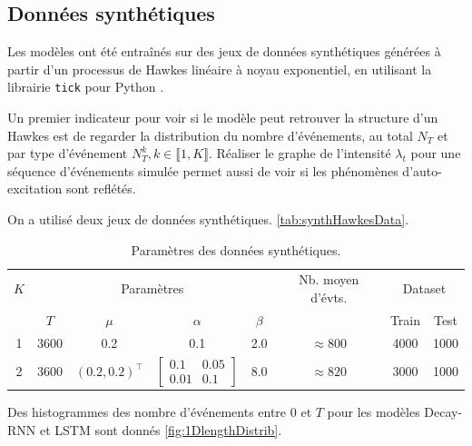 \documentclass[../main.tex]{subfiles}
\begin{document}
\subsection{Données synthétiques}\label{ssec:synthResults}

Les modèles ont été entraînés sur des jeux de données synthétiques générées à partir d'un processus de Hawkes linéaire à noyau exponentiel, en utilisant la librairie \verb|tick| pour Python \cite{2017arXiv170703003B}.

Un premier indicateur pour voir si le modèle peut retrouver la structure d'un Hawkes est de regarder la distribution du nombre d'événements, au total $N_T$ et par type d'événement $N^k_T, k\in\llbracket 1,K\rrbracket$. Réaliser le graphe de l'intensité $\lambda_t$ pour une séquence d'événements simulée permet aussi de voir si les phénomènes d'auto-excitation sont reflétés.

On a utilisé deux jeux de données synthétiques. \autoref{tab:synthHawkesData}.

\begin{table}[h]
	\centering
	\begin{tabular}{@{}cccccccc}
		\toprule
		$K$ & \multicolumn{4}{c}{Paramètres} & Nb. moyen d'évts. & \multicolumn{2}{c}{Dataset} \\ \cmidrule(r){2-5}\cmidrule(r){7-8}
		    & $T$ & $\mu$ & $\alpha$ & $\beta$ & & Train & Test\\ \midrule
		1 & 3600 & 0.2 & 0.1 & 2.0 & $\approx 800$ & 4000 & 1000 \\ \midrule
		2 & 3600 & $(0.2, 0.2)^\intercal$ & $\begin{bmatrix}0.1 & 0.05\\0.01 &0.1\end{bmatrix}$ & 8.0 & $\approx 820$ & 3000 & 1000\\
		\bottomrule
	\end{tabular}
	\caption{Paramètres des données synthétiques.}\label{tab:synthHawkesData}
\end{table}

Des histogrammes des nombre d'événements entre $0$ et $T$ pour les modèles Decay-RNN et LSTM sont donnés \autoref{fig:1DlengthDistrib}.
\end{document}
